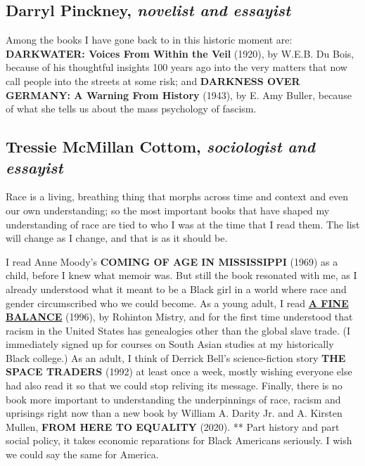 \hypertarget{darryl-pinckney-novelist-and-essayist}{%
\subsection{\texorpdfstring{Darryl Pinckney, \emph{novelist and
essayist}}{Darryl Pinckney, novelist and essayist}}\label{darryl-pinckney-novelist-and-essayist}}

Among the books I have gone back to in this historic moment are:
\textbf{DARKWATER: Voices From Within the Veil} (1920), by W.E.B. Du
Bois, because of his thoughtful insights 100 years ago into the very
matters that now call people into the streets at some risk; and
\textbf{DARKNESS OVER GERMANY: A Warning From History} (1943), by E. Amy
Buller, because of what she tells us about the mass psychology of
fascism.

\hypertarget{tressie-mcmillan-cottom-sociologist-and-essayist}{%
\subsection{\texorpdfstring{Tressie McMillan Cottom, \emph{sociologist
and
essayist}}{Tressie McMillan Cottom, sociologist and essayist}}\label{tressie-mcmillan-cottom-sociologist-and-essayist}}

Race is a living, breathing thing that morphs across time and context
and even our own understanding; so the most important books that have
shaped my understanding of race are tied to who I was at the time that I
read them. The list will change as I change, and that is as it should
be.

I read Anne Moody's \textbf{COMING OF AGE IN MISSISSIPPI} (1969) as a
child, before I knew what memoir was. But still the book resonated with
me, as I already understood what it meant to be a Black girl in a world
where race and gender circumscribed who we could become. As a young
adult, I read
\textbf{\href{https://www.nytimes.com/1996/06/23/books/an-accidental-family.html}{A
FINE BALANCE}} (1996), by Rohinton Mistry, and for the first time
understood that racism in the United States has genealogies other than
the global slave trade. (I immediately signed up for courses on South
Asian studies at my historically Black college.) As an adult, I think of
Derrick Bell's science-fiction story \textbf{THE SPACE TRADERS} (1992)
at least once a week, mostly wishing everyone else had also read it so
that we could stop reliving its message. Finally, there is no book more
important to understanding the underpinnings of race, racism and
uprisings right now than a new book by William A. Darity Jr. and A.
Kirsten Mullen, \textbf{FROM HERE TO EQUALITY} (2020). ** Part history
and part social policy, it takes economic reparations for Black
Americans seriously. I wish we could say the same for America.

